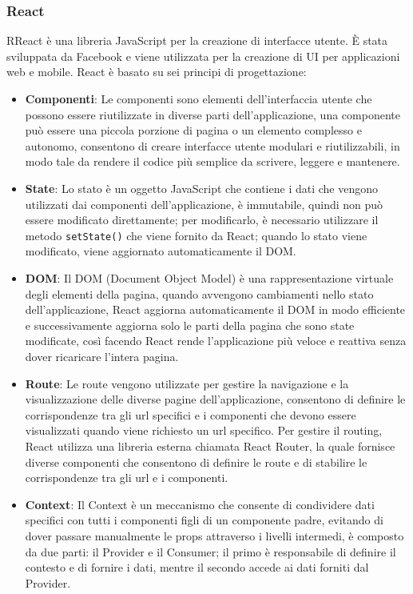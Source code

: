 \subsubsection{React}
RReact è una libreria JavaScript per la creazione di interfacce utente. È stata sviluppata da Facebook e viene utilizzata per la creazione di UI per applicazioni web e mobile. React è basato su sei principi di progettazione:
\begin{itemize}
\item \textbf{Componenti}: Le componenti sono elementi dell'interfaccia utente che possono essere riutilizzate in diverse parti dell'applicazione, una componente può essere una piccola porzione di pagina o un elemento complesso e autonomo, consentono di creare interfacce utente modulari e riutilizzabili, in modo tale da rendere il codice più semplice da scrivere, leggere e mantenere.\\
\item \textbf{State}: Lo stato è un oggetto JavaScript che contiene i dati che vengono utilizzati dai componenti dell'applicazione, è immutabile, quindi non può essere modificato direttamente; per modificarlo, è necessario utilizzare il metodo \texttt{setState()} che viene fornito da React; quando lo stato viene modificato, viene aggiornato automaticamente il DOM.\\
\item \textbf{DOM}:
Il DOM (Document Object Model) è una rappresentazione virtuale degli elementi della pagina, quando avvengono cambiamenti nello stato dell'applicazione, React aggiorna automaticamente il DOM in modo efficiente e successivamente aggiorna solo le parti della pagina che sono state modificate, così facendo React rende l'applicazione più veloce e reattiva senza dover ricaricare l'intera pagina.\\
\item \textbf{Route}:
Le route vengono utilizzate per gestire la navigazione e la visualizzazione delle diverse pagine dell'applicazione, consentono di definire le corrispondenze tra gli url specifici e i componenti che devono essere visualizzati quando viene richiesto un url specifico.
Per gestire il routing, React utilizza una libreria esterna chiamata React Router, la quale fornisce diverse componenti che consentono di definire le route e di stabilire le corrispondenze tra gli url e i componenti.\\
\item \textbf{Context}:
Il Context è un meccanismo che consente di condividere dati specifici con tutti i componenti figli di un componente padre, evitando di dover passare manualmente le props attraverso i livelli intermedi, è composto da due parti: il Provider e il Consumer; il primo è responsabile di definire il contesto e di fornire i dati, mentre il secondo accede ai dati forniti dal Provider.\\

\end{itemize}
